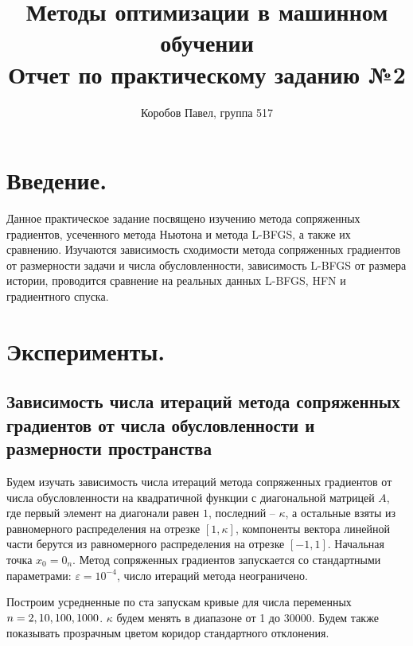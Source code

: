 \documentclass[11pt]{article}
\title{Методы оптимизации в машинном обучении \\
Отчет по практическому заданию №2}
\author{Коробов Павел, группа 517}
\begin{document}
\maketitle
\thispagestyle{empty}

\section{Введение.}
Данное практическое задание посвящено изучению метода сопряженных градиентов, усеченного метода Ньютона и метода L-BFGS, а также их сравнению. Изучаются зависимость сходимости метода сопряженных градиентов от размерности задачи и числа обусловленности, зависимость L-BFGS от размера истории, проводится сравнение на реальных данных L-BFGS, HFN и градиентного спуска.

\section{Эксперименты.}

\subsection{Зависимость числа итераций метода сопряженных градиентов от числа обусловленности и размерности пространства}

Будем изучать зависимость числа итераций метода сопряженных градиентов от числа обусловленности на квадратичной функции с диагональной матрицей $A$, где первый элемент на диагонали равен $1$, последний -- $\kappa$, а остальные взяты из равномерного распределения на отрезке $[1, \kappa]$, компоненты вектора линейной части берутся из равномерного распределения на отрезке $[-1, 1]$. Начальная точка $x_0 = 0_n$. Метод сопряженных градиентов запускается со стандартными параметрами: $\varepsilon=10^{-4}$, число итераций метода неограничено.


Построим усредненные по ста запускам кривые для числа переменных $n = 2, 10, \\100, 1000$.
$\kappa$ будем менять в диапазоне от 1 до 30000. Будем также показывать прозрачным цветом коридор стандартного отклонения.
\end{document}
